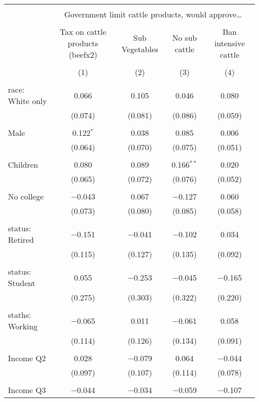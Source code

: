
\begin{tabular}{@{\extracolsep{5pt}}lcccc} 
\\[-1.8ex]\hline 
\hline \\[-1.8ex] 
 & \multicolumn{4}{c}{Government limit cattle products, would approve…} \\ 
\cline{2-5} 
\\[-1.8ex] & Tax on cattle products (beefx2) & Sub Vegetables & No sub cattle & Ban intensive cattle \\ 
\\[-1.8ex] & (1) & (2) & (3) & (4)\\ 
\hline \\[-1.8ex] 
 race: White only & 0.066 & 0.105 & 0.046 & 0.080 \\ 
  & (0.074) & (0.081) & (0.086) & (0.059) \\ 
  & & & & \\ 
 Male & 0.122$^{*}$ & 0.038 & 0.085 & 0.006 \\ 
  & (0.064) & (0.070) & (0.075) & (0.051) \\ 
  & & & & \\ 
 Children & 0.080 & 0.089 & 0.166$^{**}$ & 0.020 \\ 
  & (0.065) & (0.072) & (0.076) & (0.052) \\ 
  & & & & \\ 
 No college & $-$0.043 & 0.067 & $-$0.127 & 0.060 \\ 
  & (0.073) & (0.080) & (0.085) & (0.058) \\ 
  & & & & \\ 
 status: Retired & $-$0.151 & $-$0.041 & $-$0.102 & 0.034 \\ 
  & (0.115) & (0.127) & (0.135) & (0.092) \\ 
  & & & & \\ 
 status: Student & 0.055 & $-$0.253 & $-$0.045 & $-$0.165 \\ 
  & (0.275) & (0.303) & (0.322) & (0.220) \\ 
  & & & & \\ 
 staths: Working & $-$0.065 & 0.011 & $-$0.061 & 0.058 \\ 
  & (0.114) & (0.126) & (0.134) & (0.091) \\ 
  & & & & \\ 
 Income Q2 & 0.028 & $-$0.079 & 0.064 & $-$0.044 \\ 
  & (0.097) & (0.107) & (0.114) & (0.078) \\ 
  & & & & \\ 
 Income Q3 & $-$0.044 & $-$0.034 & $-$0.059 & $-$0.107 \\ 

\end{tabular}
